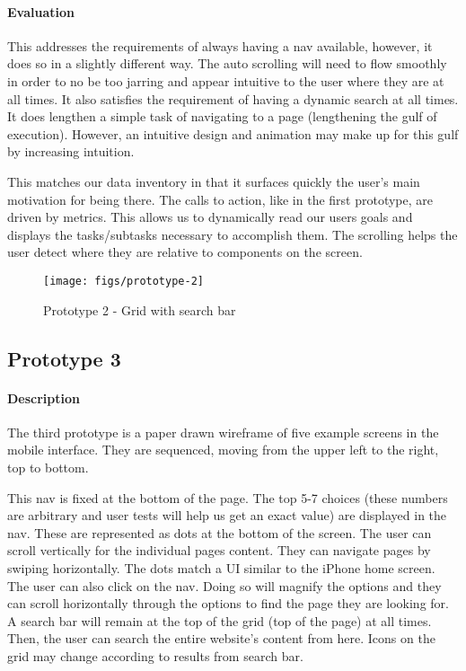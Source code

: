 \paragraph{Evaluation} This addresses the requirements of always having a nav available, however, it does so in a slightly different way. The auto scrolling will need to flow smoothly in order to no be too jarring and appear intuitive to the user where they are at all times. It also satisfies the requirement of having a dynamic search at all times. It does lengthen a simple task of navigating to a page (lengthening the gulf of execution). However, an intuitive design and animation may make up for this gulf by increasing intuition.

This matches our data inventory in that it surfaces quickly the user's main motivation for being there. The calls to action, like in the first prototype, are driven by metrics. This allows us to dynamically read our users goals and displays the tasks/subtasks necessary to accomplish them. The scrolling helps the user detect where they are relative to components on the screen.

\begin{figure}[H]
  \centering
  \texttt{[image: figs/prototype-2]}
  \caption{Prototype 2 - Grid with search bar}
  \label{fig::1}
\end{figure}


\subsection{Prototype 3}
\paragraph{Description} The third prototype is a paper drawn wireframe of five example screens in the mobile interface. They are sequenced, moving from the upper left to the right, top to bottom.

This nav is fixed at the bottom of the page. The top 5-7 choices (these numbers are arbitrary and user tests will help us get an exact value) are displayed in the nav. These are represented as dots at the bottom of the screen. The user can scroll vertically for the individual pages content. They can navigate pages by swiping horizontally. The dots match a UI similar to the iPhone home screen. The user can also click on the nav. Doing so will magnify the options and they can scroll horizontally through the options to find the page they are looking for. A search bar will remain at the top of the grid (top of the page) at all times. Then, the user can search the entire website's content from here. Icons on the grid may change according to results from search bar.

